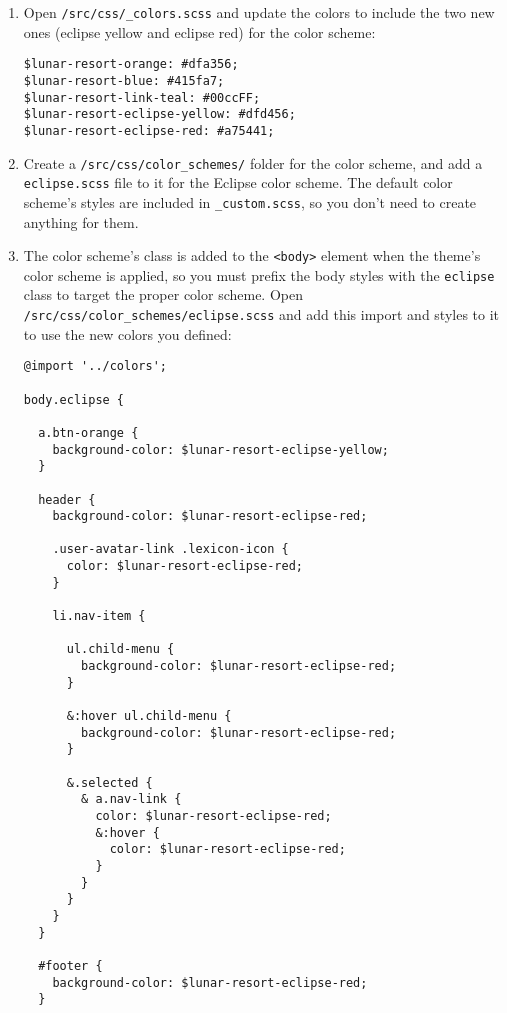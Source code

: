 \noindent\hrulefill

\begin{enumerate}
\def\labelenumi{\arabic{enumi}.}
\setcounter{enumi}{1}
\item
  Open \texttt{/src/css/\_colors.scss} and update the colors to include
  the two new ones (eclipse yellow and eclipse red) for the color
  scheme:

\begin{verbatim}
$lunar-resort-orange: #dfa356;
$lunar-resort-blue: #415fa7;
$lunar-resort-link-teal: #00ccFF;
$lunar-resort-eclipse-yellow: #dfd456;
$lunar-resort-eclipse-red: #a75441;
\end{verbatim}
\item
  Create a \texttt{/src/css/color\_schemes/} folder for the color
  scheme, and add a \texttt{eclipse.scss} file to it for the Eclipse
  color scheme. The default color scheme's styles are included in
  \texttt{\_custom.scss}, so you don't need to create anything for them.
\item
  The color scheme's class is added to the
  \texttt{\textless{}body\textgreater{}} element when the theme's color
  scheme is applied, so you must prefix the body styles with the
  \texttt{eclipse} class to target the proper color scheme. Open
  \texttt{/src/css/color\_schemes/eclipse.scss} and add this import and
  styles to it to use the new colors you defined:

\begin{verbatim}
@import '../colors';

body.eclipse {

  a.btn-orange {
    background-color: $lunar-resort-eclipse-yellow;
  }

  header {
    background-color: $lunar-resort-eclipse-red;

    .user-avatar-link .lexicon-icon {
      color: $lunar-resort-eclipse-red;
    }

    li.nav-item {

      ul.child-menu {
        background-color: $lunar-resort-eclipse-red;
      }

      &:hover ul.child-menu {
        background-color: $lunar-resort-eclipse-red;
      }

      &.selected {
        & a.nav-link {
          color: $lunar-resort-eclipse-red;
          &:hover {
            color: $lunar-resort-eclipse-red;
          }
        }
      }
    }
  }

  #footer {
    background-color: $lunar-resort-eclipse-red;
  }


\end{verbatim}
\end{enumerate}
